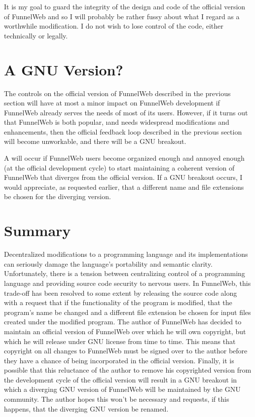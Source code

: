 It is my goal to guard the integrity of the design and code of the
official version of FunnelWeb and so I will probably be rather
fussy about what I regard as a worthwhile modification. I do not wish to
lose control of the code, either technically or legally.

\section{A GNU Version?}

The controls on the official version of FunnelWeb described in the previous
section will have at most a minor impact on FunnelWeb development if
FunnelWeb already serves the needs of most of its users. However, if it
turns out that FunnelWeb is both popular, \i{and} needs
widespread modifications and enhancements, then the official feedback loop
described in the previous section will become unworkable, and there will be
a GNU breakout.

A 
will occur if FunnelWeb users become
organized enough and annoyed enough (at the official development cycle)
to start maintaining a coherent version of FunnelWeb that
diverges from the official version.
If a GNU breakout occurs, I would appreciate, as requested earlier, that
a different name and file extensions be chosen for the diverging version.

\section{Summary}

Decentralized modifications to a programming language and its implementations
can seriously damage the language's portability and semantic clarity.
Unfortunately, there is a tension between centralizing control of a
programming language and providing source code security to nervous users.
In FunnelWeb, this trade-off has been resolved to some extent by
releasing the source code along with a request
that if the functionality of the program is modified,
that the program's name be changed and a different file
extension be chosen for input files created under the modified program.
The author of FunnelWeb has decided to maintain an official version of
FunnelWeb over which he will own copyright, but which he will release
under GNU license from time to time. This means that copyright
on all changes to FunnelWeb must be signed over to the author before they
have a chance of being incorporated in the official version. Finally, it is
possible that this reluctance of the author to remove his copyrighted
version from the development cycle of the official version
will result in a GNU breakout in which a diverging GNU
version of FunnelWeb will be maintained by the GNU community. The author
hopes this won't be necessary and requests,
if this happens, that the diverging GNU version be renamed.

